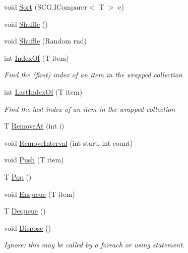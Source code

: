 \begin{DoxyCompactItemize}
\item 
void \hyperlink{class_c5_1_1_guarded_list_a8db443ee1d6d3aec4e55d772c7c14068}{Sort} (S\+C\+G.\+I\+Comparer$<$ T $>$ c)
\item 
void \hyperlink{class_c5_1_1_guarded_list_af01b219433c2383bdaab93e41c9fa589}{Shuffle} ()
\item 
void \hyperlink{class_c5_1_1_guarded_list_a10a56b270623e62b28c1fa848289d6b7}{Shuffle} (Random rnd)
\item 
int \hyperlink{class_c5_1_1_guarded_list_aac2b7de89c7556b8a1c0b49dad25174f}{Index\+Of} (T item)
\begin{DoxyCompactList}\small\item\em Find the (first) index of an item in the wrapped collection \end{DoxyCompactList}\item 
int \hyperlink{class_c5_1_1_guarded_list_a6813134b41bdb0f98b473f02800809c2}{Last\+Index\+Of} (T item)
\begin{DoxyCompactList}\small\item\em Find the last index of an item in the wrapped collection \end{DoxyCompactList}\item 
T \hyperlink{class_c5_1_1_guarded_list_a051deb35bed74f188be08a40c1e79afa}{Remove\+At} (int i)
\item 
void \hyperlink{class_c5_1_1_guarded_list_addc4ab1ca7eb4bf0daebf4453d1397e5}{Remove\+Interval} (int start, int count)
\item 
void \hyperlink{class_c5_1_1_guarded_list_aeb1663686b78f82ab36c5b1dea6812bf}{Push} (T item)
\item 
T \hyperlink{class_c5_1_1_guarded_list_a3876da9aae71b1b0e5deb93c30b26590}{Pop} ()
\item 
void \hyperlink{class_c5_1_1_guarded_list_aac03b7356764f1dd73b8f3bc17007a5e}{Enqueue} (T item)
\item 
T \hyperlink{class_c5_1_1_guarded_list_a5f1cd1c1d41e867c4551ca09ab11e193}{Dequeue} ()
\item 
void \hyperlink{class_c5_1_1_guarded_list_a58d8480779038215c09fcf1b4b80396a}{Dispose} ()
\begin{DoxyCompactList}\small\item\em Ignore\+: this may be called by a foreach or using statement. \end{DoxyCompactList}\end{DoxyCompactItemize}
